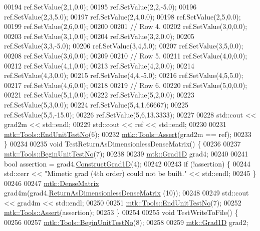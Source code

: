 \begin{DoxyCode}
00194   ref.SetValue(2,1,0.0);
00195   ref.SetValue(2,2,-5.0);
00196   ref.SetValue(2,3,5.0);
00197   ref.SetValue(2,4,0.0);
00198   ref.SetValue(2,5,0.0);
00199   ref.SetValue(2,6,0.0);
00200 
00201   \textcolor{comment}{// Row 4.}
00202   ref.SetValue(3,0,0.0);
00203   ref.SetValue(3,1,0.0);
00204   ref.SetValue(3,2,0.0);
00205   ref.SetValue(3,3,-5.0);
00206   ref.SetValue(3,4,5.0);
00207   ref.SetValue(3,5,0.0);
00208   ref.SetValue(3,6,0.0);
00209 
00210   \textcolor{comment}{// Row 5.}
00211   ref.SetValue(4,0,0.0);
00212   ref.SetValue(4,1,0.0);
00213   ref.SetValue(4,2,0.0);
00214   ref.SetValue(4,3,0.0);
00215   ref.SetValue(4,4,-5.0);
00216   ref.SetValue(4,5,5.0);
00217   ref.SetValue(4,6,0.0);
00218 
00219   \textcolor{comment}{// Row 6.}
00220   ref.SetValue(5,0,0.0);
00221   ref.SetValue(5,1,0.0);
00222   ref.SetValue(5,2,0.0);
00223   ref.SetValue(5,3,0.0);
00224   ref.SetValue(5,4,1.66667);
00225   ref.SetValue(5,5,-15.0);
00226   ref.SetValue(5,6,13.3333);
00227 
00228   std::cout << grad2m << std::endl;
00229   std::cout << ref << std::endl;
00230 
00231   \hyperlink{classmtk_1_1Tools_aba67d9dc35c9c1c49430fcc9ea035e03}{mtk::Tools::EndUnitTestNo}(6);
00232   \hyperlink{classmtk_1_1Tools_ac6804df469c94ab6a796fb64f1e44a89}{mtk::Tools::Assert}(grad2m == ref);
00233 \}
00234 
00235 \textcolor{keywordtype}{void} TestReturnAsDimensionlessDenseMatrix() \{
00236 
00237   \hyperlink{classmtk_1_1Tools_afc29ecaf337a13ed2e817d3890a5a441}{mtk::Tools::BeginUnitTestNo}(7);
00238 
00239   \hyperlink{classmtk_1_1Grad1D}{mtk::Grad1D} grad4;
00240 
00241   \textcolor{keywordtype}{bool} assertion = grad4.\hyperlink{classmtk_1_1Grad1D_a74ef5245cfae6fd158bd7f563a0c2e52}{ConstructGrad1D}(4);
00242 
00243   \textcolor{keywordflow}{if} (!assertion) \{
00244     std::cerr << \textcolor{stringliteral}{"Mimetic grad (4th order) could not be built."} << std::endl;
00245   \}
00246 
00247   \hyperlink{classmtk_1_1DenseMatrix}{mtk::DenseMatrix} grad4m(grad4.\hyperlink{classmtk_1_1Grad1D_ab07e6a15edca32534ae3d1a8ccaf1c42}{ReturnAsDimensionlessDenseMatrix}
      (10));
00248 
00249   std::cout << grad4m << std::endl;
00250 
00251   \hyperlink{classmtk_1_1Tools_aba67d9dc35c9c1c49430fcc9ea035e03}{mtk::Tools::EndUnitTestNo}(7);
00252   \hyperlink{classmtk_1_1Tools_ac6804df469c94ab6a796fb64f1e44a89}{mtk::Tools::Assert}(assertion);
00253 \}
00254 
00255 \textcolor{keywordtype}{void} TestWriteToFile() \{
00256 
00257   \hyperlink{classmtk_1_1Tools_afc29ecaf337a13ed2e817d3890a5a441}{mtk::Tools::BeginUnitTestNo}(8);
00258 
00259   \hyperlink{classmtk_1_1Grad1D}{mtk::Grad1D} grad2;

\end{DoxyCode}

